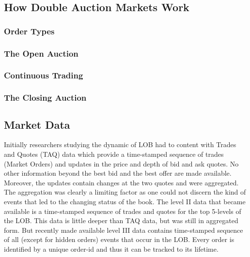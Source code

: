 \subsection{How Double Auction Markets Work}
\subsubsection{Order Types}
\subsubsection{The Open Auction}
\subsubsection{Continuous Trading}
\subsubsection{The Closing Auction}
\subsection{Market Data}

Initially researchers studying the dynamic of LOB had to content with Trades and Quotes (TAQ) data which provide a time-stamped sequence of trades (Market Orders) and updates in the price and depth of bid and ask quotes. No other information beyond the best bid and the best offer are made available. Moreover, the updates contain changes at the two quotes and were aggregated. The aggregation was clearly a limiting factor as one could not discern the kind of events that led to the changing status of the book. The level II data that became available is a time-stamped sequence of trades and quotes for the top 5-levels of the LOB. This data is little deeper than TAQ data, but was still in aggregated form. But recently made available level III data contains time-stamped sequence of all (except for hidden orders) events that occur in the LOB. Every order is identified by a unique order-id and thus it can be tracked to its lifetime. \\


